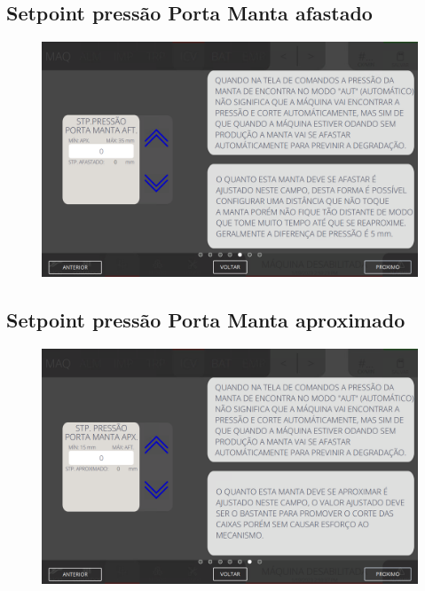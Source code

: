 \newpage
\thispagestyle{fancy}
\vspace{\fill}
\subsection{Setpoint pressão Porta Manta afastado}
\begin{figure}
    \centering
    \includegraphics[width=480 px,height=300 px]{src/imagesICV/06-dryCutter/settings/e-5ERRO.png}
\end{figure}

\newpage
\thispagestyle{fancy}
\vspace{\fill}
\subsection{Setpoint pressão Porta Manta aproximado}
\begin{figure}
    \centering
    \includegraphics[width=576 px,height=360 px]{src/imagesICV/06-dryCutter/settings/e-6.png}
\end{figure}

